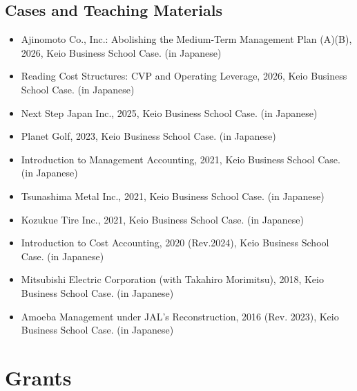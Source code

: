 \documentclass[letterpaper,11pt]{article}
\begin{document}
\subsection*{Cases and Teaching Materials}

\begin{itemize}
    \item Ajinomoto Co., Inc.: Abolishing the Medium-Term Management Plan (A)(B), 2026, Keio Business School Case. (in Japanese)
    \item Reading Cost Structures: CVP and Operating Leverage, 2026, Keio Business School Case. (in Japanese)
    \item Next Step Japan Inc., 2025, Keio Business School Case. (in Japanese)
    \item Planet Golf, 2023, Keio Business School Case. (in Japanese)
    \item Introduction to Management Accounting, 2021, Keio Business School Case. (in Japanese)
    \item Tsunashima Metal Inc., 2021, Keio Business School Case. (in Japanese)
    \item Kozukue Tire Inc., 2021, Keio Business School Case. (in Japanese)
    \item Introduction to Cost Accounting, 2020 (Rev.2024), Keio Business School Case. (in Japanese)
    \item Mitsubishi Electric Corporation (with Takahiro Morimitsu), 2018, Keio Business School Case. (in Japanese)
    \item Amoeba Management under JAL's Reconstruction, 2016 (Rev. 2023), Keio Business School Case. (in Japanese)
\end{itemize}

\section*{Grants}
\end{document}
